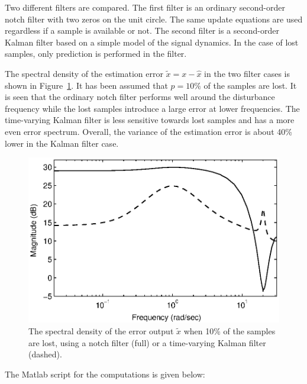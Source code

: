 \documentclass[final,twoside]{rapport}  %
\begin{document}
Two different filters are compared. The first filter is an ordinary
second-order notch filter with two zeros on the unit circle. The same
update equations are used regardless if a sample is available or
not. The second filter is a second-order Kalman filter based on a
simple model of the signal dynamics. In the case of lost samples,
only prediction is performed in the filter.

The spectral density of the estimation error $\tilde x = x - \hat x$ in
the two filter cases is shown in Figure~\ref{fig:notchplot}. It has
been assumed that $p=10\%$ of the samples are lost. It is seen that 
the ordinary notch filter performs well around the disturbance frequency
while the lost samples introduce a large error at lower frequencies. The
time-varying Kalman filter is less sensitive towards lost samples and
has a more even error spectrum. Overall, the variance of the
estimation error is about 40\% lower in the Kalman filter case.

\begin{figure}[tbp]
\centerline{
\includegraphics[scale=0.7]{fig2.eps}}
  \caption{The spectral density of the error output $\tilde x$ when 10\%
    of the samples are lost, using a notch filter (full) or a
    time-varying Kalman filter (dashed).}
  \label{fig:notchplot}
\end{figure}

The Matlab script for the computations is given below:
\begin{small}

\end{small}
\end{document}
